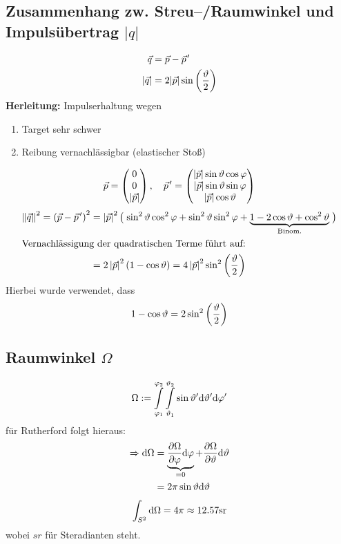 \documentclass[Ex4_Zusammenfassung.tex]{subfiles}
\begin{document}
\subsection{Zusammenhang zw. Streu--/Raumwinkel und Impulsübertrag $|q|$}
\begin{align}
	\vec{q} &= \vec{p} - \pvec{p}^\prime \\
	|\vec{q}| &= 2 |\vec{p}| \sin \lp \frac{\vartheta}{2} \rp 
\end{align}
\textbf{Herleitung:} Impulserhaltung wegen
\begin{enumerate}
	\item Target sehr schwer
	\item Reibung vernachlässigbar (elastischer Stoß)
\end{enumerate}
\begin{equation}
	\vec{p} = \threevec{0}{0}{|\vec{p}|}, \quad \pvec{p}^\prime = \threevec{|\vec{p}| \sin \vartheta \cos \varphi}{|\vec{p}| \sin \vartheta \sin \varphi}{|\vec{p}| \cos \vartheta}
\end{equation}
\begin{align}
	\left\Vert \vec{q} \right\Vert^2 = \lp \vec{p} - \pvec{p}^\prime \rp^2 &= \left\vert \vec{p} \right\vert^2
	\lp \vphantom{\sin^2 \vartheta \cos^2 \varphi + \sin^2 \vartheta \sin^2 \varphi } \right.
	\sin^2 \vartheta \cos^2 \varphi + \sin^2 \vartheta \sin^2 \varphi + \underbrace{1 - 2\cos \vartheta + \cos^2 \vartheta}_{\text{Binom.}} 
	\left. \vphantom{\sin^2 \vartheta \cos^2 \varphi + \sin^2 \vartheta \sin^2 \varphi} \rp\\
	\intertext{Vernachlässigung der quadratischen Terme führt auf:}
	&= 2 \left\vert \vec{p} \right\vert^2 \lp 1 - \cos \vartheta \rp = 4 \left\vert \vec{p} \right\vert^2 \sin^2 \lp \frac{\vartheta}{2} \rp
\end{align}
Hierbei wurde verwendet, dass
\begin{equation*}
	1 - \cos \vartheta = 2 \sin^2 \lp \frac{\vartheta}{2} \rp
\end{equation*}

\subsection{Raumwinkel $\Omega$}
\begin{equation}
	\Omega := \mathop{\int}_{\varphi_1}^{\varphi_2} \mathop{\int}_{\vartheta_1}^{\vartheta_2} \sin \vartheta^\prime \md \vartheta^\prime \md \varphi^\prime
\end{equation}
für Rutherford folgt hieraus: 
\begin{align}
	\Rightarrow \md \Omega &= \underbrace{\frac{\partial \Omega}{\partial \varphi} \md \varphi}_{=0} + \frac{\partial \Omega}{\partial \vartheta} \md \vartheta\\
	&= 2 \pi \sin \vartheta \md \vartheta
\end{align}
\begin{equation}
	\int_{S^2} \md \Omega = 4\pi \approx 12.57\si{sr}
\end{equation}
wobei $\si{sr}$ für Steradianten steht.
\end{document}
